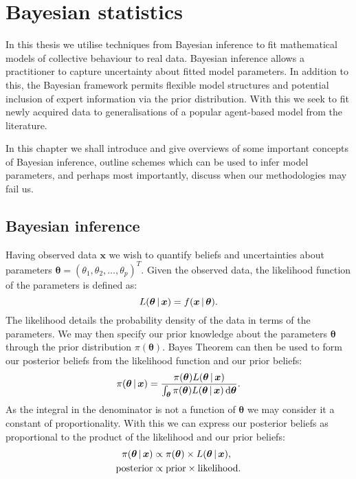 \graphicspath{{fig/bayes_intro/}}

\chapter{Bayesian statistics}
\label{cha:bayes_intro}

In this thesis we utilise techniques from Bayesian inference to fit mathematical models of
collective behaviour to real data. Bayesian inference allows a practitioner to capture
uncertainty about fitted model parameters. In addition to this, the Bayesian framework
permits flexible model structures and potential inclusion of expert information via the
prior distribution. With this we seek to fit newly acquired data to generalisations of a
popular agent-based model from the literature.

In this chapter we shall introduce and give overviews of some important concepts of
Bayesian inference, outline schemes which can be used to infer model parameters, and
perhaps most importantly, discuss when our methodologies may fail us.

\section{Bayesian inference}
\label{sec:bayesian_inference}

Having observed data $\bm{x}$ we wish to quantify beliefs and uncertainties about
parameters $\bm{\theta} = (\theta_1, \theta_2,\dots,\theta_p)^T$. Given the observed data,
the likelihood function of the parameters is defined as:
\begin{equation}
  L(\bm{\theta}\,|\,\bm{x}) = f(\bm{x} \,|\, \bm{\theta}).
\end{equation}
The likelihood details the probability density of the data in terms of the parameters. We
may then specify our prior knowledge about the parameters $\bm{\theta}$ through the prior
distribution $\pi(\bm{\theta})$. Bayes Theorem can then be used to form our posterior
beliefs from the likelihood function and our prior beliefs:
\begin{equation}
  \label{eq:bayes_theorem}
  \pi(\bm{\theta}\given\bm{x}) =
    \frac{\pi(\bm{\theta}) L(\bm{\theta}\given\bm{x})}%
         {\int_{\bm{\theta}} \pi(\bm{\theta}) L(\bm{\theta}\given\bm{x}) \, \textup{d}\bm{\theta}}.
\end{equation}
As the integral in the denominator is not a function of $\bm{\theta}$ we may consider it a
constant of proportionality. With this we can express our posterior beliefs as
proportional to the product of the likelihood and our prior beliefs:
\begin{align*}
  \pi(\bm{\theta}\,|\,\bm{x}) & \propto \pi(\bm{\theta}) \times L(\bm{\theta}\,|\,\bm{x}), \\
  \text{posterior}             & \propto \text{prior} \times \text{likelihood}.
\end{align*}

